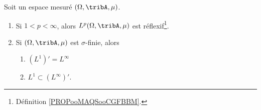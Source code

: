\begin{theorem}     \label{THOooXMVTooBAbyvr}
    Soit un espace mesuré \( (\Omega,\tribA,\mu)\).
    \begin{enumerate}
        \item   \label{ITEMooNCVEooTyNsoJ}
            Si \( 1<p<\infty\), alors \( L^p(\Omega,\tribA,\mu)\) est réflexif\footnote{Définition \ref{PROPooMAQSooCGFBBM}.}.
        \item   \label{ITEMooTQDJooFShTiA}
            Si \( (\Omega,\tribA,\mu)\) est \( \sigma\)-finie, alors
            \begin{enumerate}
                \item       \label{ITEMooHMMZooMQxWgB}
                    \( (L^1)'=L^{\infty}\)
                \item       \label{ITEMooBFFZooNxoHER}
                    \( L^1\subset (L^{\infty})' \).
            \end{enumerate}
    \end{enumerate}
\end{theorem}

